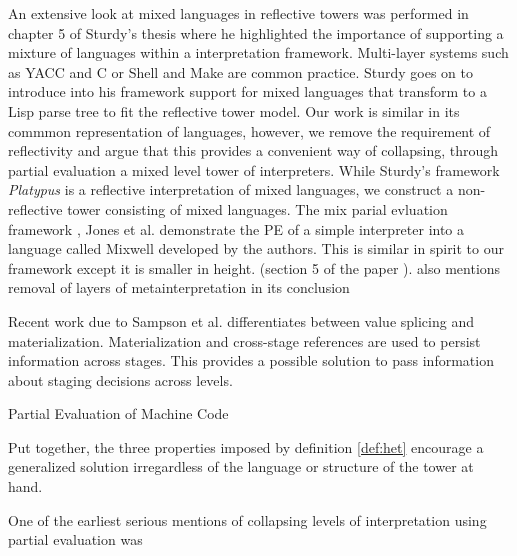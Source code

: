 \documentclass{article}
\theoremstyle{definition}
\begin{document}
An extensive look at mixed languages in reflective towers was performed in chapter 5 of Sturdy's thesis \cite{sturdy1993lisp} where he highlighted the importance of supporting a mixture of languages within a interpretation framework. Multi-layer systems such as YACC and C or Shell and Make are common practice. Sturdy goes on to introduce into his framework support for mixed languages that transform to a Lisp parse tree to fit the reflective tower model. Our work is similar in its commmon representation of languages, however, we remove the requirement of reflectivity and argue that this provides a convenient way of collapsing, through partial evaluation a mixed level tower of interpreters. While Sturdy's framework \textit{Platypus} is a reflective interpretation of mixed languages, we construct a non-reflective tower consisting of mixed languages.
\pagebreak
The mix parial evluation framework \cite{jones1989mix}, Jones et al. demonstrate the PE of a simple interpreter into a language called Mixwell developed by the authors. This is similar in spirit to our framework except it is smaller in height. (section 5 of the paper \cite{jones1989mix}). also mentions removal of layers of metainterpretation in its conclusion

Recent work due to Sampson et al. \cite{sampson2017static} differentiates between value splicing and materialization. Materialization and cross-stage references are used to persist information across stages. This provides a possible solution to pass information about staging decisions across levels.

Partial Evaluation of Machine Code

Put together, the three properties imposed by definition \ref{def:het} encourage a generalized solution irregardless of the language or structure of the tower at hand.

One of the earliest serious mentions of collapsing levels of interpretation using partial evaluation was \cite{sturdy1993lisp}

\end{document}
